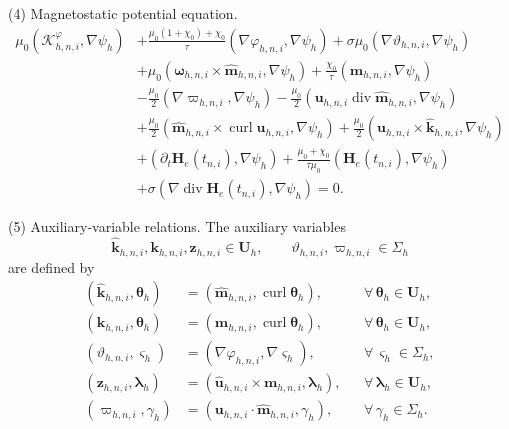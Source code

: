 \documentclass[11pt,a4paper]{article}
\newcommand{\bs}{\boldsymbol}
\DeclareMathOperator{\curl}{curl}
\DeclareMathOperator{\ddiv}{div}
\newcommand{\Div}{\ddiv}
\theoremstyle{definition}
\numberwithin{equation}{section}
\begin{document}
\noindent
(4) Magnetostatic potential equation.
\begin{equation}\label{eq:mag-sta-sol}
\begin{aligned}
\mu_0(\mathcal K_{h,n,i}^\varphi,\nabla\psi_h)
&+
\frac{\mu_0(1+\chi_0)+\chi_0}{\tau}
(\nabla\varphi_{h,n,i},\nabla\psi_h)
+
\sigma\mu_0
(\nabla\vartheta_{h,n,i},\nabla\psi_h)
\\
&+
\mu_0
(\bs\omega_{h,n,i}\times\widehat{\bs m}_{h,n,i},
 \nabla\psi_h)
+
\frac{\chi_0}{\tau}
(\bs m_{h,n,i},\nabla\psi_h)
\\
&-
\frac{\mu_0}{2}
(\nabla\varpi_{h,n,i},\nabla\psi_h)
-
\frac{\mu_0}{2}
(\bs u_{h,n,i}\Div\widehat{\bs m}_{h,n,i},
 \nabla\psi_h)
\\
&+
\frac{\mu_0}{2}
(\widehat{\bs m}_{h,n,i}\times\curl\bs u_{h,n,i},
 \nabla\psi_h)
+
\frac{\mu_0}{2}
(\bs u_{h,n,i}\times\widehat{\bs k}_{h,n,i},
 \nabla\psi_h)
\\
&+
(\partial_t\bs H_e(t_{n,i}),\nabla\psi_h)
+
\frac{\mu_0+\chi_0}{\tau\mu_0}
(\bs H_e(t_{n,i}),\nabla\psi_h)
\\
&+
\sigma
(\nabla\Div\bs H_e(t_{n,i}),\nabla\psi_h)
=
0.
\end{aligned}
\end{equation}

\noindent
(5) Auxiliary-variable relations.
The auxiliary variables
\[
\widehat{\bs k}_{h,n,i},\bs k_{h,n,i},\bs z_{h,n,i}\in\bs U_h,
\qquad
\vartheta_{h,n,i},\varpi_{h,n,i}\in\Sigma_h
\]
are defined by
\begin{equation}\label{eq:lag-sol}
\begin{aligned}
(\widehat{\bs k}_{h,n,i},\bs\theta_h)
&=
(\widehat{\bs m}_{h,n,i},\curl\bs\theta_h),
&&
\forall\,\bs\theta_h\in\bs U_h,
\\
(\bs k_{h,n,i},\bs\theta_h)
&=
(\bs m_{h,n,i},\curl\bs\theta_h),
&&
\forall\,\bs\theta_h\in\bs U_h,
\\
(\vartheta_{h,n,i},\varsigma_h)
&=
(\nabla\varphi_{h,n,i},\nabla\varsigma_h),
&&
\forall\,\varsigma_h\in\Sigma_h,
\\
(\bs z_{h,n,i},\bs\lambda_h)
&=
(\widehat{\bs u}_{h,n,i}\times\bs m_{h,n,i},
 \bs\lambda_h),
&&
\forall\,\bs\lambda_h\in\bs U_h,
\\
(\varpi_{h,n,i},\gamma_h)
&=
(\bs u_{h,n,i}\cdot\widehat{\bs m}_{h,n,i},
 \gamma_h),
&&
\forall\,\gamma_h\in\Sigma_h.
\end{aligned}
\end{equation}
\end{document}
